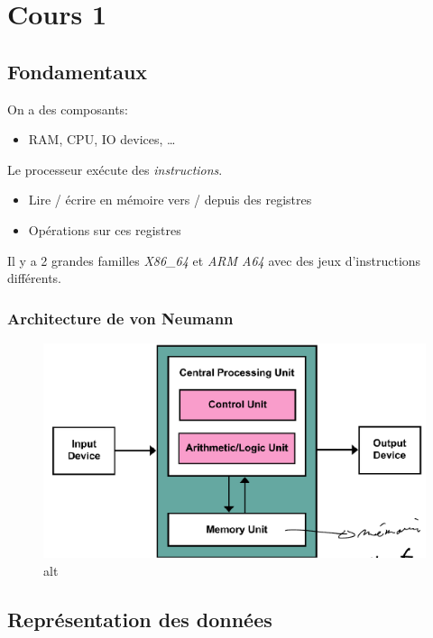\section{Cours 1}\label{cours-1}

\subsection{Fondamentaux}\label{fondamentaux}

On a des composants:

\begin{itemize}
\tightlist
\item
  RAM, CPU, IO devices, \ldots{}
\end{itemize}

Le processeur exécute des \emph{instructions}.

\begin{itemize}
\tightlist
\item
  Lire / écrire en mémoire vers / depuis des registres
\item
  Opérations sur ces registres
\end{itemize}

Il y a 2 grandes familles \emph{X86\_64} et \emph{ARM A64} avec des jeux
d'instructions différents.

\subsubsection{Architecture de von
Neumann}\label{architecture-de-von-neumann}

\begin{figure}
\centering
\includegraphics{image-5.png}
\caption{alt}
\end{figure}

\subsection{Représentation des
données}\label{repruxe9sentation-des-donnuxe9es}


